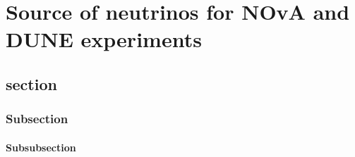 \chapter{Source of neutrinos for NOvA and DUNE experiments}\label{chapterNeutrinoBeam}

\section{section}

\subsection{Subsection}

\subsubsection{Subsubsection}